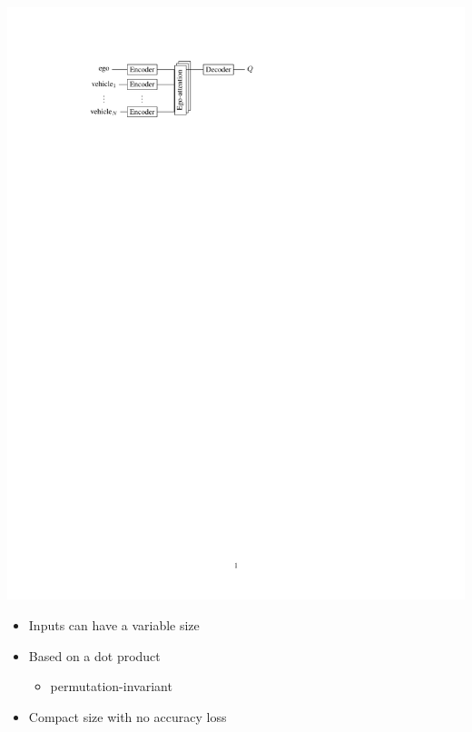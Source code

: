 \documentclass[paperwidth=36in,paperheight=48in,portrait,fontscale=0.3, margin=2cm]{baposter}
\begin{document}
\begin{poster}
{\begin{center}
	\begin{minipage}{0.4\textwidth}
		\includegraphics[trim={3.8cm 22.5cm 10cm 2.5cm}, clip, page=1, width=\linewidth]{img/architecture}
		\begin{itemize}
			\item[\hlg{\checkmark}] Inputs can have a {variable size}
			\item[\hlg{\checkmark}] Based on a dot product
			\begin{itemize}
				\item[$\incarrow$] {permutation-invariant}
			\end{itemize}
			\item[\hlg{\checkmark}] Compact size with no accuracy loss
		\end{itemize}
	\end{minipage}
	\begin{minipage}{0.59\textwidth}

\end{minipage}
\end{center}}
\end{poster}
\end{document}
